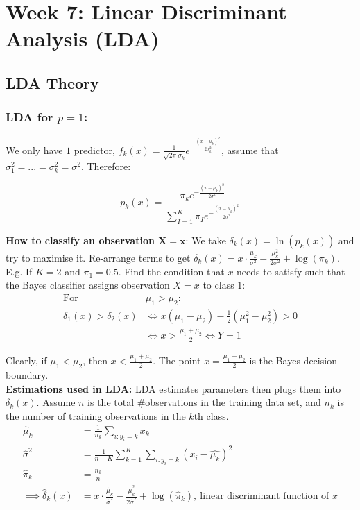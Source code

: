 \documentclass[11pt]{article}
\begin{document}
\section{Week 7: Linear Discriminant Analysis (LDA)}
\subsection{LDA Theory}

\subsubsection{LDA for $p = 1$:}
\noindent We only have $1$ predictor, $f_k(x) = \frac{1}{\sqrt{2\pi}\sigma_{k}}e^{-\frac{(x-\mu_k)^2}{2\sigma_{k}^{2}}}$, assume that $\sigma_1^2 = ... = \sigma_k^2 = \sigma^2$. Therefore:

$$p_k(x) = \frac{\pi_k e^{-\frac{(x - \mu_k)^2}{2\sigma^2}}}{\sum_{I=1}^{K}{\pi_I  e^{-\frac{(x - \mu_k)^2}{2\sigma^2}}}}$$

\noindent \textbf{How to classify an observation $\boldsymbol{X = x}$}: We take $\delta_k(x) = \ln(p_k(x))$ and try to maximise it. Re-arrange terms to get $\delta_k(x) = x \cdot \frac{\mu_k}{\sigma^2} - \frac{\mu_k^2}{2\sigma^2} + \log(\pi_k)$. \\

\noindent E.g. If $K=2$ and $\pi_1 = 0.5$. Find the condition that $x$ needs to satisfy such that the Bayes classifier assigns observation $X=x$ to class $1$: \\

\begin{align*}
    \text{For } & \mu_1 > \mu_2: \\
    \delta_1(x) > \delta_{2}(x) &\Leftrightarrow x(\mu_1 - \mu_2) - \frac{1}{2}(\mu_1^2 - \mu_2^2) > 0 \\
    &\Leftrightarrow x > \frac{\mu_1 + \mu_2}{2} \Leftrightarrow Y = 1
\end{align*}

\noindent Clearly, if $\mu_1 < \mu_2$, then $x < \frac{\mu_1 + \mu_2}{2}$. The point $x = \frac{\mu_1 + \mu_2}{2}$ is the Bayes decision boundary. \\

\noindent \textbf{Estimations used in LDA:} LDA estimates parameters then plugs them into $\delta_k(x)$. Assume $n$ is the total \#observations in the training data set, and $n_k$ is the number of training observations in the $k$th class. \\

\begin{align*}
    \hat{\mu}_k &= \frac{1}{n_k} \sum_{i: y_i = k}{x_k} \\
    \hat{\sigma}^2 &= \frac{1}{n-K}\sum_{k=1}^{K}\sum_{i: y_i = k}(x_i - \hat{\mu_k})^2 \\
    \hat{\pi}_k &= \frac{n_k}{n} \\
    \implies \hat{\delta}_k(x) &= x \cdot \frac{\hat{\mu}_k}{\hat{\sigma}^2} - \frac{\hat{\mu}_k^2}{2\hat{\sigma}^2} + \log(\hat{\pi}_k), \ \text{linear discriminant function of $x$}
\end{align*}
\end{document}
